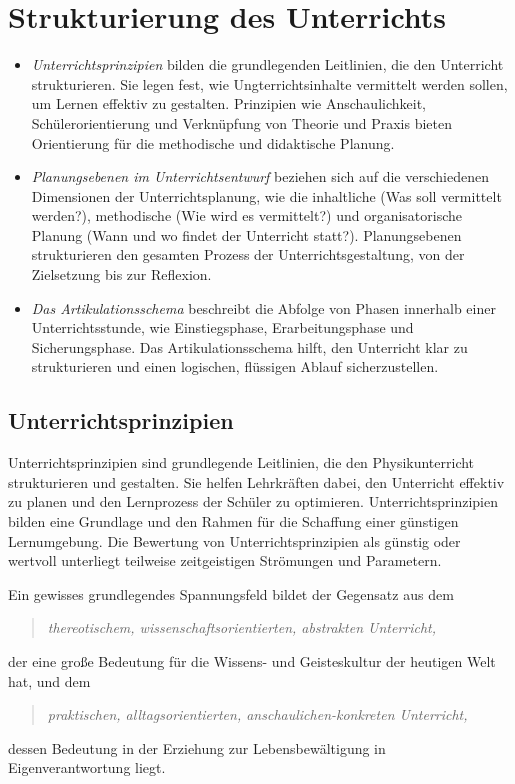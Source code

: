 \chapter{Strukturierung des Unterrichts}\label{Unterricht}


\begin{itemize}
\item
\emph{Unterrichtsprinzipien} bilden die grundlegenden Leitlinien, die den Unterricht strukturieren. Sie legen fest, wie Ungterrichtsinhalte vermittelt werden sollen, um Lernen effektiv zu gestalten. Prinzipien wie Anschaulichkeit, Sch\"{u}lerorientierung und Verkn\"{u}pfung von Theorie und Praxis bieten Orientierung f\"{u}r die methodische und didaktische Planung. 
\item
\emph{Planungsebenen im Unterrichtsentwurf} beziehen sich auf die verschiedenen Dimensionen der Unterrichtsplanung, wie die inhaltliche (Was soll vermittelt werden?), methodische (Wie wird es vermittelt?) und organisatorische Planung (Wann und wo findet der Unterricht statt?). Planungsebenen strukturieren den gesamten Prozess der Unterrichtsgestaltung, von der Zielsetzung bis zur Reflexion.
\item
\emph{Das Artikulationsschema} beschreibt die Abfolge von Phasen innerhalb einer Unterrichtsstunde, wie Einstiegsphase, Erarbeitungsphase und Sicherungsphase. Das Artikulationsschema hilft, den Unterricht klar zu strukturieren und einen logischen, fl\"{u}ssigen Ablauf sicherzustellen.
\end{itemize}

\bip\bip
\section{Unterrichtsprinzipien}
Unterrichtsprinzipien sind grundlegende Leitlinien, die den Physikunterricht strukturieren und gestalten. Sie helfen Lehrkr\"{a}ften dabei, den Unterricht effektiv zu planen und den Lernprozess der Sch\"{u}ler zu optimieren. Unterrichtsprinzipien bilden eine Grundlage und den Rahmen f\"{u}r die Schaffung einer g\"{u}nstigen Lernumgebung. 
Die Bewertung von Unterrichtsprinzipien als g\"{u}nstig oder wertvoll unterliegt teilweise zeitgeistigen Str\"{o}mungen und Parametern.

Ein gewisses grundlegendes Spannungsfeld bildet der Gegensatz aus dem
\begin{quote}
\emph{thereotischem, wissenschaftsorientierten, abstrakten Unterricht,}
\end{quote}
der eine gro{\ss}e Bedeutung f\"{u}r die Wissens- und Geisteskultur der
heutigen Welt hat,
und dem
\begin{quote}
\emph{praktischen, alltagsorientierten,
anschaulichen-konkreten Unterricht,}
\end{quote}
dessen Bedeutung in der Erziehung zur Lebensbew\"{a}ltigung in
Eigenverantwortung liegt.

